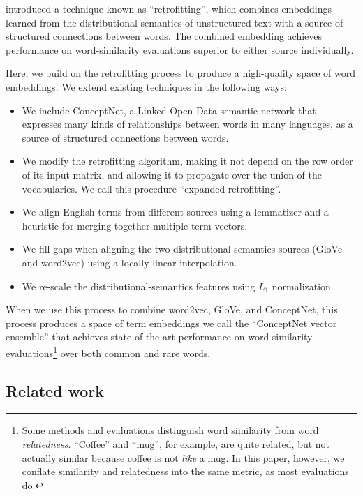 \documentclass[11pt,letterpaper]{article}
\begin{document}
 introduced a technique
known as ``retrofitting'', which combines embeddings learned from the
distributional semantics of unstructured text with a source of structured
connections between words. The combined embedding achieves performance on
word-similarity evaluations superior to either source individually.

Here, we build on the retrofitting process to produce a high-quality space of
word embeddings. We extend existing techniques in the following ways:

\begin{itemize}
\item We include ConceptNet, a Linked Open Data semantic network that expresses
many kinds of relationships between words in many languages, as a source of
structured connections between words.
\item We modify the retrofitting algorithm, making it not depend on the row
order of its input matrix, and allowing it to propagate over the union of the
vocabularies. We call this procedure ``expanded retrofitting''.
\item We align English terms from different sources using a lemmatizer and a
heuristic for merging together multiple term vectors.
\item We fill gaps when aligning the two distributional-semantics sources
(GloVe and word2vec) using a locally linear interpolation.
\item We re-scale the distributional-semantics features using $L_1$ normalization.
\end{itemize}

When we use this process to combine word2vec, GloVe, and ConceptNet, this
process produces a space of term embeddings we call the ``ConceptNet vector
ensemble'' that achieves state-of-the-art performance on word-similarity
evaluations\footnote{Some methods and evaluations \cite{agirre2009similarity}
distinguish word similarity from word
{\em relatedness}. ``Coffee'' and ``mug'', for example, are quite related,
but not actually similar because coffee is not {\em like} a mug. In this paper,
however, we conflate similarity and relatedness into the same metric, as most
evaluations do.}
over both common and rare words.


\subsection{Related work}

\end{document}
